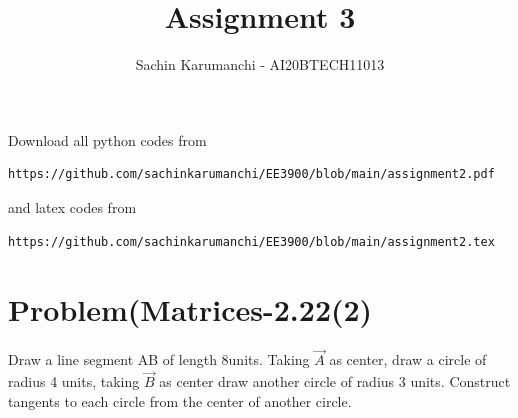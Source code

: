 \documentclass[journal,12pt,twocolumn]{IEEEtran}
\begin{document}
\let\StandardTheFigure\thefigure
\let\vec\mathbf
\renewcommand{\thefigure}{\theproblem}
\def\putbox#1#2#3{\makebox[0in][l]{\makebox[#1][l]{}\raisebox{\baselineskip}[0in][0in]{\raisebox{#2}[0in][0in]{#3}}}}
     \def\rightbox#1{\makebox[0in][r]{#1}}
     \def\centbox#1{\makebox[0in]{#1}}
     \def\topbox#1{\raisebox{-\baselineskip}[0in][0in]{#1}}
     \def\midbox#1{\raisebox{-0.5\baselineskip}[0in][0in]{#1}}
\vspace{3cm}
\title{Assignment 3}
\author{Sachin Karumanchi - AI20BTECH11013}
\maketitle
\newpage
\bigskip
\renewcommand{\thefigure}{\theenumi}
\renewcommand{\thetable}{\theenumi}
Download all python codes from
\begin{lstlisting}
https://github.com/sachinkarumanchi/EE3900/blob/main/assignment2.pdf
\end{lstlisting}
and latex codes from
\begin{lstlisting}
https://github.com/sachinkarumanchi/EE3900/blob/main/assignment2.tex
\end{lstlisting}
\section*{Problem(Matrices-2.22(2)}
Draw a line segment AB of length 8units. Taking $\Vec{A}$ as center, draw a circle of radius 4 units, taking $\Vec{B}$ as center draw another circle of radius 3 units. Construct tangents to each circle from the center of another circle. 
\end{document}
